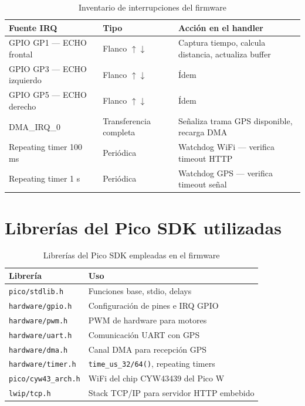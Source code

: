 \documentclass[12pt]{report}
\begin{document}
\begin{table}[H]
\centering
\renewcommand{\arraystretch}{1.4}
\begin{tabular}{|l|l|p{5.5cm}|}
\hline
\textbf{Fuente IRQ} & \textbf{Tipo} & \textbf{Acción en el handler} \\
\hline
GPIO GP1 — ECHO frontal & Flanco $\uparrow\downarrow$ & Captura tiempo, calcula distancia, actualiza buffer \\
\hline
GPIO GP3 — ECHO izquierdo & Flanco $\uparrow\downarrow$ & Ídem \\
\hline
GPIO GP5 — ECHO derecho & Flanco $\uparrow\downarrow$ & Ídem \\
\hline
DMA\_IRQ\_0 & Transferencia completa & Señaliza trama GPS disponible, recarga DMA \\
\hline
Repeating timer 100 ms & Periódica & Watchdog WiFi — verifica timeout HTTP \\
\hline
Repeating timer 1 s & Periódica & Watchdog GPS — verifica timeout señal \\
\hline
\end{tabular}
\caption{Inventario de interrupciones del firmware}
\end{table}

\section{Librerías del Pico SDK utilizadas}

\begin{table}[H]
\centering
\renewcommand{\arraystretch}{1.3}
\begin{tabular}{|l|p{8cm}|}
\hline
\textbf{Librería} & \textbf{Uso} \\
\hline
\texttt{pico/stdlib.h} & Funciones base, stdio, delays \\
\hline
\texttt{hardware/gpio.h} & Configuración de pines e IRQ GPIO \\
\hline
\texttt{hardware/pwm.h} & PWM de hardware para motores \\
\hline
\texttt{hardware/uart.h} & Comunicación UART con GPS \\
\hline
\texttt{hardware/dma.h} & Canal DMA para recepción GPS \\
\hline
\texttt{hardware/timer.h} & \texttt{time\_us\_32/64()}, repeating timers \\
\hline
\texttt{pico/cyw43\_arch.h} & WiFi del chip CYW43439 del Pico W \\
\hline
\texttt{lwip/tcp.h} & Stack TCP/IP para servidor HTTP embebido \\
\hline
\end{tabular}
\caption{Librerías del Pico SDK empleadas en el firmware}
\end{table}
\end{document}
